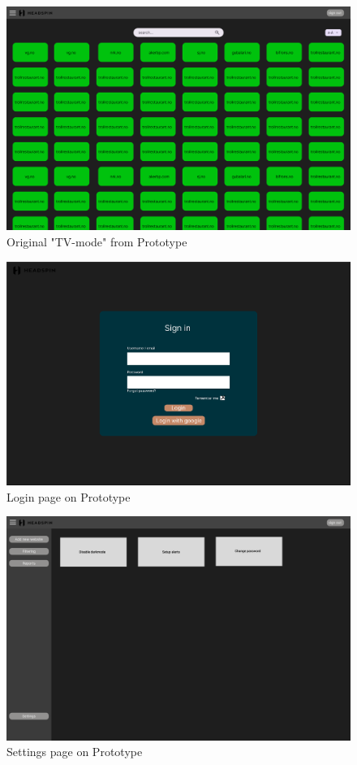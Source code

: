\begin{figure}
    \centering
    \includegraphics[width=0.75\linewidth]{figures/prototype/prototype_tv-mode.png}
    \caption{Original "TV-mode" from Prototype}
    \label{fig:appendix_prototype_dashboard}
\end{figure}

\begin{figure}
    \centering
    \includegraphics[width=0.75\linewidth]{figures/prototype/prototype_login.png}
    \caption{Login page on Prototype}
    \label{fig:appendix_prototype_dashboard}
\end{figure}

\begin{figure}
    \centering
    \includegraphics[width=0.75\linewidth]{figures/prototype/prototype_settingspage.png}
    \caption{Settings page on Prototype}
    \label{fig:app_prototype_settings}
\end{figure}

